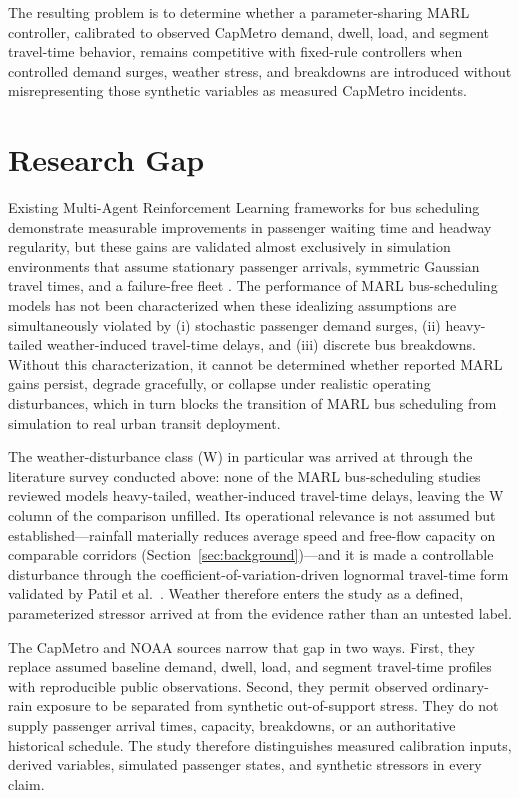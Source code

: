 The resulting problem is to determine whether a parameter-sharing MARL controller, calibrated to observed CapMetro demand, dwell, load, and segment travel-time behavior, remains competitive with fixed-rule controllers when controlled demand surges, weather stress, and breakdowns are introduced without misrepresenting those synthetic variables as measured CapMetro incidents.

\section{Research Gap}

Existing Multi-Agent Reinforcement Learning frameworks for bus scheduling demonstrate measurable improvements in passenger waiting time and headway regularity, but these gains are validated almost exclusively in simulation environments that assume stationary passenger arrivals, symmetric Gaussian travel times, and a failure-free fleet \cite{Wang2020Holding,Rodriguez2023Cooperative,Wangsun}. The performance of MARL bus-scheduling models has not been characterized when these idealizing assumptions are simultaneously violated by (i) stochastic passenger demand surges, (ii) heavy-tailed weather-induced travel-time delays, and (iii) discrete bus breakdowns. Without this characterization, it cannot be determined whether reported MARL gains persist, degrade gracefully, or collapse under realistic operating disturbances, which in turn blocks the transition of MARL bus scheduling from simulation to real urban transit deployment.

The weather-disturbance class (W) in particular was arrived at through the literature survey conducted above: none of the MARL bus-scheduling studies reviewed models heavy-tailed, weather-induced travel-time delays, leaving the W column of the comparison unfilled. Its operational relevance is not assumed but established---rainfall materially reduces average speed and free-flow capacity on comparable corridors (Section~\ref{sec:background})---and it is made a controllable disturbance through the coefficient-of-variation-driven lognormal travel-time form validated by Patil et al.~\cite{Patil2025Conformal}. Weather therefore enters the study as a defined, parameterized stressor arrived at from the evidence rather than an untested label.

The CapMetro and NOAA sources narrow that gap in two ways. First, they replace assumed baseline demand, dwell, load, and segment travel-time profiles with reproducible public observations. Second, they permit observed ordinary-rain exposure to be separated from synthetic out-of-support stress. They do not supply passenger arrival times, capacity, breakdowns, or an authoritative historical schedule. The study therefore distinguishes measured calibration inputs, derived variables, simulated passenger states, and synthetic stressors in every claim.

